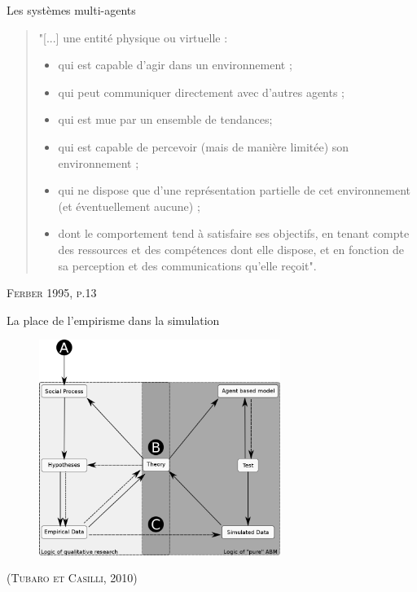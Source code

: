\documentclass[newPxFont]{beamer}
\begin{document}
\begin{frame}[c]{Les systèmes multi-agents}
\vspace{-2em}
\small
\begin{quote}
  "[...] une entité physique ou virtuelle :
    \begin{itemize}
      \item qui est capable d'agir dans un environnement ;
      \item qui peut communiquer directement avec d'autres agents ;
      \item qui est mue par un ensemble de tendances;
      \item qui est capable de percevoir (mais de manière limitée) son environnement ;
      \item qui ne dispose que d'une représentation partielle de cet environnement (et éventuellement aucune) ;
      \item dont le comportement tend à satisfaire ses objectifs, en tenant compte des ressources et des compétences dont elle dispose, et en fonction de sa perception et des communications qu'elle reçoit".
    \end{itemize}
\end{quote}
\hspace*{\fill}\textsc{Ferber 1995, p.13}
\end{frame}

\begin{frame}[c]{La place de l'empirisme dans la simulation}
\vspace{-2em}
\begin{figure}
 \includegraphics[height=7cm]{img/a_theory_cassili.png}
\end{figure}
\hspace*{\fill}\textsc{(Tubaro et Casilli, 2010)}
\end{frame}
\end{document}
